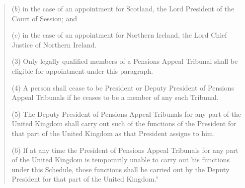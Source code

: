 \documentclass[12pt,a4paper]{article}
\begin{document}
\begin{quotation}
\begin{enumerate}
($b$) in the case of an appointment for Scotland, the Lord President of the Court of Session; and

($c$) in the case of an appointment for Northern Ireland, the Lord Chief Justice of Northern Ireland.
\end{enumerate}

(3) Only legally qualified members of a Pensions Appeal Tribunal shall be eligible for appointment under this paragraph.

(4) A person shall cease to be President or Deputy President of Pensions Appeal Tribunals if he ceases to be a member of any such Tribunal.

(5) The Deputy President of Pensions Appeal Tribunals for any part of the United Kingdom shall carry out such of the functions of the President for that part of the United Kingdom as that President assigns to him.

(6) If at any time the President of Pensions Appeal Tribunals for any part of the United Kingdom is temporarily unable to carry out his functions under this Schedule, those functions shall be carried out by the Deputy President for that part of the United Kingdom.”
\end{quotation}
\end{document}
